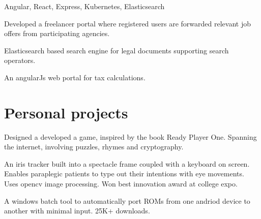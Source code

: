 \documentclass[]{font}
\begin{document}
\begin{minipage}[t]{0.66\textwidth}
Angular, React, Express, Kubernetes, Elasticsearch
\begin{tightemize}
\item Developed a freelancer portal where registered users are forwarded relevant job offers from participating agencies. 
\item Elasticsearch based search engine for legal documents supporting search operators.
\item An angularJs web portal for tax calculations.
\end{tightemize}    


\sectionsep



\section{Personal projects}

Designed a developed a game, inspired by the book Ready Player One. Spanning the internet, involving puzzles, rhymes and cryptography.
\sectionsep

An iris tracker built into a spectacle frame coupled with a keyboard on screen. Enables paraplegic patients to type out their intentions with eye movements. Uses opencv image processing. Won best innovation award at college expo.
\sectionsep

A windows batch tool to automatically port ROMs from one andriod device to another with minimal input. 25K+ downloads.
\sectionsep

\end{minipage} 
\end{document}
